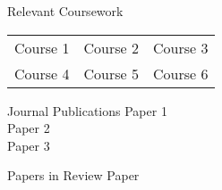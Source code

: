 \documentclass{resume} %
\begin{document}

\begin{rSection}{Relevant Coursework}

\begin{tabular}{c c c}
    Course 1 & Course 2 & Course 3\\
    Course 4 & Course 5 & Course 6
\end{tabular}

\end{rSection}

\pagebreak


\begin{rSection}{Journal Publications}
    Paper 1\\
    Paper 2\\
    Paper 3
\end{rSection}


\begin{rSection}{Papers in Review}
    Paper
\end{rSection}

\end{document}
